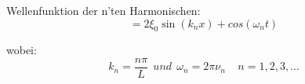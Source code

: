 \documentclass[7pt]{article}
\begin{document}
\begin{multicols*}{3}
Wellenfunktion der n'ten Harmonischen:
\begin{equation*}
= 2 \xi _0 \sin(k_n x) + cos(\omega _n t)
\end{equation*}

wobei:
\begin{equation*}
k_n = \frac{n\pi}{L} \>\> und \>\> \omega _n = 2\pi \nu _n \>\>\>\>\> n=1,2,3,...
\end{equation*}

\end{multicols*}
\end{document}
